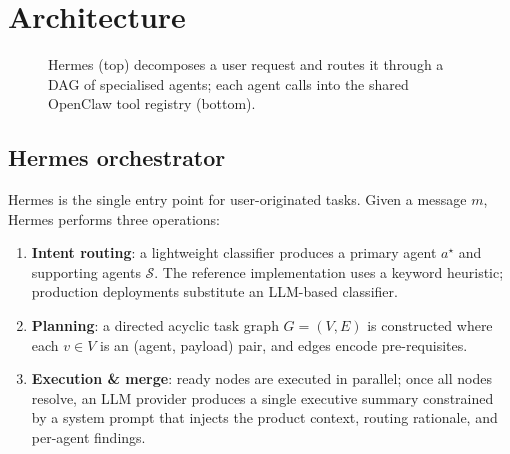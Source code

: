 \documentclass[11pt,a4paper]{article}
\begin{document}
\section{Architecture}
\label{sec:architecture}

\begin{figure}[h]
\centering
{}
\caption{Hermes (top) decomposes a user request and routes it through a DAG of
specialised agents; each agent calls into the shared OpenClaw tool registry
(bottom).}
\label{fig:architecture}
\end{figure}

\subsection{Hermes orchestrator}
\label{sec:hermes}

Hermes is the single entry point for user-originated tasks. Given a message $m$,
Hermes performs three operations:
\begin{enumerate}
  \item \textbf{Intent routing}: a lightweight classifier produces a primary
    agent $a^\star$ and supporting agents $\mathcal{S}$. The reference
    implementation uses a keyword heuristic; production deployments substitute
    an LLM-based classifier.
  \item \textbf{Planning}: a directed acyclic task graph $G=(V,E)$ is
    constructed where each $v\in V$ is an (agent, payload) pair, and edges
    encode pre-requisites.
  \item \textbf{Execution \& merge}: ready nodes are executed in parallel; once
    all nodes resolve, an LLM provider produces a single executive summary
    constrained by a system prompt that injects the product context, routing
    rationale, and per-agent findings.
\end{enumerate}
\end{document}
